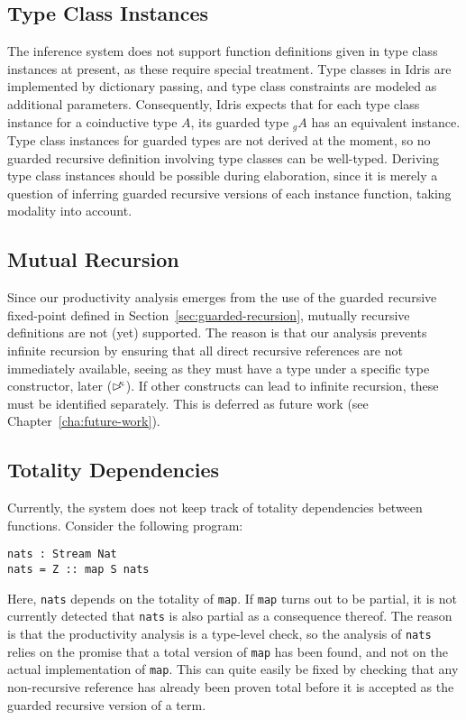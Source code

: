 \subsection{Type Class Instances}
The inference system does not support function definitions given in type class
instances at present, as these require special treatment. Type classes in Idris
are implemented by dictionary passing, and type class constraints are modeled as
additional parameters. Consequently, Idris expects that for each type class
instance for a coinductive type $A$, its guarded type $_gA$ has an equivalent
instance. Type class instances for guarded types are not derived at the moment,
so no guarded recursive definition involving type classes can be
well-typed. Deriving type class instances should be possible during elaboration,
since it is merely a question of inferring guarded recursive versions of each
instance function, taking modality into account.


\subsection{Mutual Recursion}
Since our productivity analysis emerges from the use of the guarded recursive
fixed-point defined in Section~\ref{sec:guarded-recursion}, mutually recursive
definitions are not (yet) supported. The reason is that our analysis prevents
infinite recursion by ensuring that all direct recursive references are not
immediately available, seeing as they must have a type under a specific type
constructor, later ($\rhd^{\!\!\kappa}$). If other constructs can lead to infinite
recursion, these must be identified separately. This is deferred as future work
(see Chapter~\ref{cha:future-work}).

\subsection{Totality Dependencies}
Currently, the system does not keep track of totality dependencies between
functions. Consider the following program:
\begin{lstlisting}[mathescape]
nats : Stream Nat
nats = Z :: map S nats
\end{lstlisting}
Here, \texttt{nats} depends on the totality of \texttt{map}. If \texttt{map}
turns out to be partial, it is not currently detected that \texttt{nats} is also
partial as a consequence thereof. The reason is that the productivity analysis
is a type-level check, so the analysis of \texttt{nats} relies on the promise that
a total version of \texttt{map} has been found, and not on the actual
implementation of \texttt{map}. This can quite easily be fixed by checking that
any non-recursive reference has already been proven total before it is accepted
as the guarded recursive version of a term.

